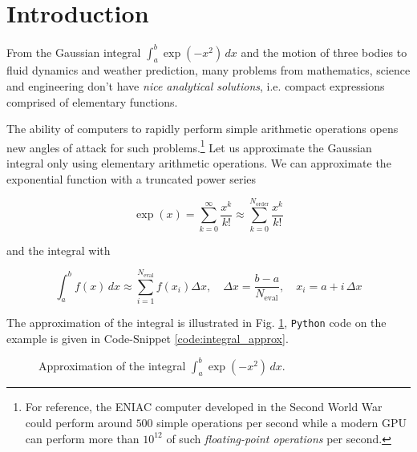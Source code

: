 \section{Introduction}
\thispagestyle{plain}

From the Gaussian integral $\int_a^b \exp{(-x^2)} \, dx$ 
and the motion of three bodies to fluid dynamics
and weather prediction, many problems from 
mathematics, science and engineering don't have
\textit{nice analytical solutions}, i.e. compact
expressions comprised of elementary functions.

The ability of computers to rapidly perform
simple arithmetic operations opens new angles
of attack for such problems.\footnote{For reference,
the ENIAC computer developed in the Second World War could
perform around $500$ simple operations per second while a modern
GPU can perform more than $10^{12}$ of such \textit{floating-point operations} 
per second.} Let us approximate the Gaussian integral only using
elementary arithmetic operations. We can approximate
the exponential function with a truncated power series

\begin{equation}
    \exp(x) = \sum_{k=0}^{\infty} \frac{x^k}{k!} \approx \sum_{k=0}^{N_\text{order}} \frac{x^k}{k!}
\end{equation}

and the integral with

\begin{equation}
    \int_a^b f(x) \, dx \approx \sum_{i = 1}^{N_\text{eval}} f(x_i) \Delta x, \quad \Delta x = \frac{b - a}{N_\text{eval}}, \quad x_i = a + i \, \Delta x
\end{equation}

The approximation of the integral is illustrated in Fig. \ref{fig:integral_approx}, \texttt{Python} code on the example
is given in Code-Snippet \ref{code:integral_approx}.

\begin{figure}[!htb]
 \centering
 \hfill
 \caption{Approximation of the integral $\int_a^b \exp{(-x^2)} \, dx$.}
 \label{fig:integral_approx}
\end{figure}

